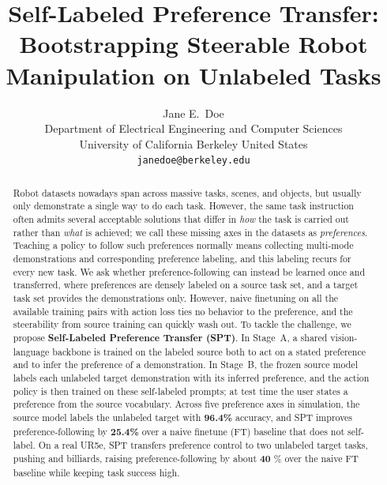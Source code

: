 \documentclass{article}
\title{Self-Labeled Preference Transfer: Bootstrapping Steerable Robot Manipulation on Unlabeled Tasks}
\author{
  Jane E.~Doe\\
  Department of Electrical Engineering and Computer Sciences\\
  University of California Berkeley
  United States\\
  \texttt{janedoe@berkeley.edu}
}
\begin{document}
\maketitle


\begin{abstract}
Robot datasets nowadays span across massive tasks, scenes, and objects, but usually only demonstrate a single way to do each task.
However, the same task instruction often admits several acceptable solutions that differ in \emph{how} the task is carried out rather than \emph{what} is achieved; we call these missing axes in the datasets as \emph{preferences}.
Teaching a policy to follow such preferences normally means collecting multi-mode demonstrations and corresponding preference labeling, and this labeling recurs for every new task.
We ask whether preference-following can instead be learned once and transferred, where preferences are densely labeled on a source task set, and a target task set provides the demonstrations only.
However, naive finetuning on all the available training pairs with action loss ties no behavior to the preference, and the steerability from source training can quickly wash out.
To tackle the challenge, we propose \textbf{Self-Labeled Preference Transfer (SPT)}.
In Stage~A, a shared vision-language backbone is trained on the labeled source both to act on a stated preference and to infer the preference of a demonstration.
In Stage~B, the frozen source model labels each unlabeled target demonstration with its inferred preference, and the action policy is then trained on these self-labeled prompts; at test time the user states a preference from the source vocabulary.
Across five preference axes in simulation, the source model labels the unlabeled target with \textbf{96.4\%} accuracy, and SPT improves preference-following by \textbf{25.4\%} over a naive finetune (FT) baseline that does not self-label.
On a real UR5e, SPT transfers preference control to two unlabeled target tasks, pushing and billiards, raising preference-following by about \textbf{40} \% over the naive FT baseline while keeping task success high.



\end{abstract}
\end{document}
